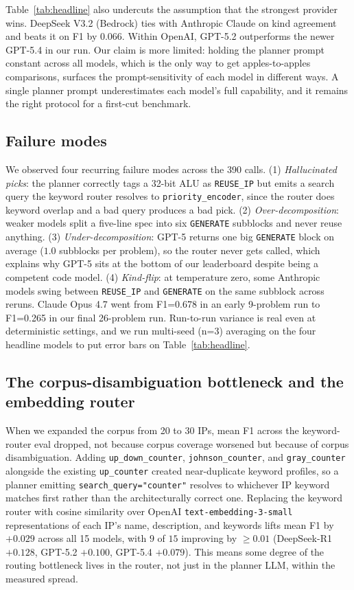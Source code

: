 \documentclass[conference]{IEEEtran}
\begin{document}
Table~\ref{tab:headline} also undercuts the assumption that the strongest provider wins. DeepSeek V3.2 (Bedrock) ties with Anthropic Claude on kind agreement and beats it on F1 by 0.066. Within OpenAI, GPT-5.2 outperforms the newer GPT-5.4 in our run. Our claim is more limited: holding the planner prompt constant across all models, which is the only way to get apples-to-apples comparisons, surfaces the prompt-sensitivity of each model in different ways. A single planner prompt underestimates each model's full capability, and it remains the right protocol for a first-cut benchmark.

\subsection{Failure modes}

We observed four recurring failure modes across the 390 calls. (1) \emph{Hallucinated picks}: the planner correctly tags a 32-bit ALU as \texttt{REUSE\_IP} but emits a search query the keyword router resolves to \texttt{priority\_encoder}, since the router does keyword overlap and a bad query produces a bad pick. (2) \emph{Over-decomposition}: weaker models split a five-line spec into six \texttt{GENERATE} subblocks and never reuse anything. (3) \emph{Under-decomposition}: GPT-5 returns one big \texttt{GENERATE} block on average ($1.0$ subblocks per problem), so the router never gets called, which explains why GPT-5 sits at the bottom of our leaderboard despite being a competent code model. (4) \emph{Kind-flip}: at temperature zero, some Anthropic models swing between \texttt{REUSE\_IP} and \texttt{GENERATE} on the same subblock across reruns. Claude Opus 4.7 went from F1=0.678 in an early 9-problem run to F1=0.265 in our final 26-problem run. Run-to-run variance is real even at deterministic settings, and we run multi-seed (n=3) averaging on the four headline models to put error bars on Table~\ref{tab:headline}.

\subsection{The corpus-disambiguation bottleneck and the embedding router}

When we expanded the corpus from 20 to 30 IPs, mean F1 across the keyword-router eval dropped, not because corpus coverage worsened but because of corpus disambiguation. Adding \texttt{up\_down\_counter}, \texttt{johnson\_counter}, and \texttt{gray\_counter} alongside the existing \texttt{up\_counter} created near-duplicate keyword profiles, so a planner emitting \texttt{search\_query="counter"} resolves to whichever IP keyword matches first rather than the architecturally correct one. Replacing the keyword router with cosine similarity over OpenAI \texttt{text-embedding-3-small} representations of each IP's name, description, and keywords lifts mean F1 by $+0.029$ across all 15 models, with $9$ of $15$ improving by $\geq 0.01$ (DeepSeek-R1 $+0.128$, GPT-5.2 $+0.100$, GPT-5.4 $+0.079$). This means some degree of the routing bottleneck lives in the router, not just in the planner LLM, within the measured spread.
\end{document}
